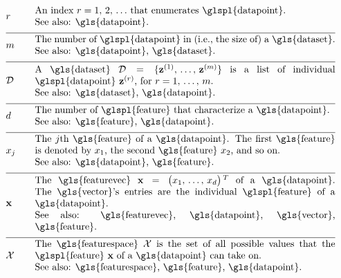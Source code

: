 \begin{align}
	&\sampleidx &\quad & \parbox{.90\textwidth}{An index $\sampleidx=1, \,2, \,\ldots$ that 
		enumerates \glspl{datapoint}.
		\\ See also: \gls{datapoint}. }   \nonumber \\[2mm] \hline \nonumber\\[-5mm]
	&\samplesize &\quad &\parbox{.90\textwidth}{The number of \glspl{datapoint} in (i.e., the size of) a \gls{dataset}.
		\\ See also: \gls{datapoint}, \gls{dataset}.} \nonumber \\[2mm] \hline \nonumber\\[-5mm] 
	&\dataset &\quad & \parbox{.90\textwidth}{A \gls{dataset} $\dataset = \{ \datapoint^{(1)}, \,\ldots, \,\datapoint^{(\samplesize)} \}$ 
		is a list of individual \glspl{datapoint} $\datapoint^{(\sampleidx)}$, for $\sampleidx=1, \,\ldots, \,\samplesize$.
		\\ See also: \gls{dataset}, \gls{datapoint}.}   \nonumber \\[2mm] \hline \nonumber\\[-5mm]
	&\featurelen &\quad &\parbox{.90\textwidth}{The number of \glspl{feature} that characterize a \gls{datapoint}.
		\\ See also: \gls{feature}, \gls{datapoint}.}\nonumber \\[2mm] \hline \nonumber\\[-5mm]
	&\feature_{\featureidx} &\quad &\parbox{.90\textwidth}{The $\featureidx$th \gls{feature} of a \gls{datapoint}. The first \gls{feature} 
		is denoted by $\feature_{1}$, the second \gls{feature} $\feature_{2}$, and so on.
		\\ See also: \gls{datapoint}, \gls{feature}. } \nonumber \\[2mm] \hline \nonumber\\[-5mm] 
	&\featurevec &\quad &\parbox{.90\textwidth}{The \gls{featurevec} $\featurevec=\big(\feature_{1}, \,\ldots, \,\feature_{\featuredim}\big)\,^{T}$ of 
		a \gls{datapoint}. The \gls{vector}'s entries are the individual \glspl{feature} of a \gls{datapoint}.
		\\ See also: \gls{featurevec}, \gls{datapoint}, \gls{vector}, \gls{feature}. }\nonumber \\[2mm] \hline \nonumber\\[-5mm]
	&\featurespace &\quad & \parbox{.90\textwidth}{The \gls{featurespace} $\featurespace$ is 
		the set of all possible values that the \glspl{feature} $\featurevec$ of a \gls{datapoint} can take on.
		\\ See also: \gls{featurespace}, \gls{feature}, \gls{datapoint}.} \nonumber 
\end{align}        

